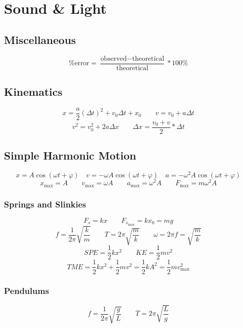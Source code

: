 \chapter{Sound \& Light}

\newcommand\meter[0]{\text{m}}
\newcommand\watt[0]{\text{W}}
\newcommand\Joule[0]{\text{J}}
\newcommand\second[0]{\text{s}}
\newcommand\decibel[0]{\text{dB}}

\section{Miscellaneous}

\[
	\text{\% error} = \frac{\text{observed} - \text{theoretical}}{\text{theoretical}} * 100\%
\]

\section{Kinematics}

\[
	x = \frac{a}{2}(\Delta t)^2 + v_0\Delta t + x_0 \qquad
	v = v_0 + a\Delta t
\]\[
	v^2 = v_0^2 + 2a\Delta x \qquad
	\Delta x = \frac{v_0 + v}{2} * \Delta t
\]

\section{Simple Harmonic Motion}

\[
	x = A \cos(\omega t + \varphi) \quad
	v = -\omega A \cos(\omega t + \varphi) \quad
	a = -\omega^2 A \cos(\omega t + \varphi)
\]
\[
	x_{\max} = A \qquad
	v_{\max} = \omega A \qquad
	a_{\max} = \omega^2 A \qquad
	F_{\max} = m\omega^2 A
\]

\subsection{Springs and Slinkies}

\[
	F_s = kx \qquad
	F_{s_{\max}} = kx_0 = mg
\]
\[
	f = \frac{1}{2\pi}\sqrt{\frac{k}{m}} \qquad 
	T = 2\pi\sqrt{\frac{m}{k}} \qquad 
	\omega = 2\pi f = \sqrt{\frac{m}{k}}
\]
\[
	SPE = \frac{1}{2} kx^2 \qquad
	KE = \frac{1}{2} mv^2
\]
\[
	TME = \frac{1}{2} kx^2 + \frac{1}{2} mv^2 = \frac{1}{2} kA^2 = \frac{1}{2} mv_{\max}^2
\]

\subsection{Pendulums}

\[
	f = \frac{1}{2\pi}\sqrt{\frac{g}{L}} \qquad 
	T = 2\pi \sqrt{\frac{L}{g}}
\]

